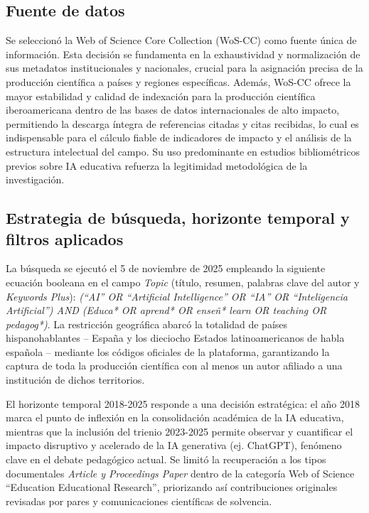 \documentclass[spanish]{textolivre}
\begin{document}
\subsection{Fuente de datos}
Se seleccionó la Web of Science Core Collection (WoS-CC) como fuente única de información. Esta decisión se fundamenta en la exhaustividad y normalización de sus metadatos institucionales y nacionales, crucial para la asignación precisa de la producción científica a países y regiones específicas. Además, WoS-CC ofrece la mayor estabilidad y calidad de indexación para la producción científica iberoamericana dentro de las bases de datos internacionales de alto impacto, permitiendo la descarga íntegra de referencias citadas y citas recibidas, lo cual es indispensable para el cálculo fiable de indicadores de impacto y el análisis de la estructura intelectual del campo. Su uso predominante en estudios bibliométricos previos sobre IA educativa refuerza la legitimidad metodológica de la investigación.


\subsection{Estrategia de búsqueda, horizonte temporal y filtros aplicados}
La búsqueda se ejecutó el 5 de noviembre de 2025 empleando la siguiente ecuación booleana en el campo \textit{Topic} (título, resumen, palabras clave del autor y \textit{Keywords Plus}): \textit{(``AI'' OR ``Artificial Intelligence'' OR ``IA'' OR ``Inteligencia Artificial'') AND (Educa* OR aprend* OR enseñ* learn OR teaching OR pedagog*)}. La restricción geográfica abarcó la totalidad de países hispanohablantes -- España y los dieciocho Estados latinoamericanos de habla española -- mediante los códigos oficiales de la plataforma, garantizando la captura de toda la producción científica con al menos un autor afiliado a una institución de dichos territorios.

El horizonte temporal 2018-2025 responde a una decisión estratégica: el año 2018 marca el punto de inflexión en la consolidación académica de la IA educativa, mientras que la inclusión del trienio 2023-2025 permite observar y cuantificar el impacto disruptivo y acelerado de la IA generativa (ej. ChatGPT), fenómeno clave en el debate pedagógico actual. Se limitó la recuperación a los tipos documentales \textit{Article y Proceedings Paper} dentro de la categoría Web of Science ``Education Educational Research'', priorizando así contribuciones originales revisadas por pares y comunicaciones científicas de solvencia.
\end{document}
